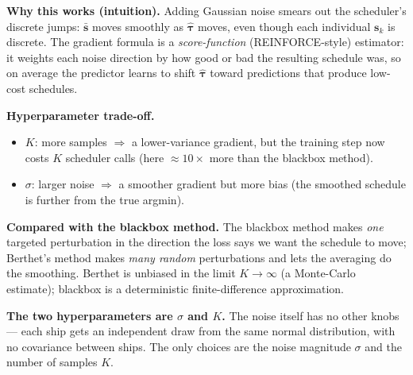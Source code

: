 \documentclass[11pt]{article}
\begin{document}
\noindent
\textbf{Why this works (intuition).} Adding Gaussian noise smears out
the scheduler's discrete jumps: $\bar{\boldsymbol{s}}$ moves smoothly
as $\hat{\boldsymbol{\tau}}$ moves, even though each individual
$\boldsymbol{s}_k$ is discrete. The gradient formula is a
\emph{score-function} (REINFORCE-style) estimator: it weights each
noise direction by how good or bad the resulting schedule was, so on
average the predictor learns to shift $\hat{\boldsymbol{\tau}}$
toward predictions that produce low-cost schedules.

\noindent
\textbf{Hyperparameter trade-off.}
\begin{itemize}\setlength{\itemsep}{0pt}
  \item $K$: more samples $\Rightarrow$ a lower-variance gradient,
        but the training step now costs $K$ scheduler calls
        (here $\approx 10\times$ more than the blackbox method).
  \item $\sigma$: larger noise $\Rightarrow$ a smoother gradient but
        more bias (the smoothed schedule is further from the true
        argmin).
\end{itemize}

\noindent
\textbf{Compared with the blackbox method.} The blackbox method makes
\emph{one} targeted perturbation in the direction the loss says we
want the schedule to move; Berthet's method makes \emph{many random}
perturbations and lets the averaging do the smoothing. Berthet is
unbiased in the limit $K \to \infty$ (a Monte-Carlo estimate);
blackbox is a deterministic finite-difference approximation.


\vspace{0.6em}

\noindent
\textbf{The two hyperparameters are $\sigma$ and $K$.}
The noise itself has no other knobs --- each ship gets an independent
draw from the same normal distribution, with no covariance between
ships. The only choices are the noise magnitude $\sigma$ and the
number of samples $K$.

\vspace{0.4em}
\end{document}
